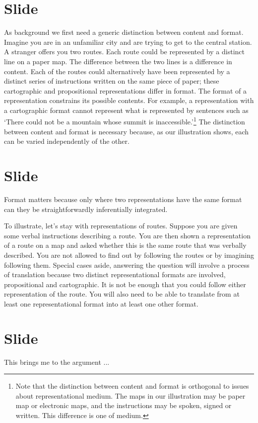 \documentclass[12pt,\papersize]{extarticle}
\begin{document}
\section{Slide}
As background we first need a generic distinction between content and format. Imagine you are in an unfamiliar city and are trying to get to the central station. A stranger offers you two routes. Each route could be represented by a distinct line on a paper map. The difference between the two lines is a difference in content. Each of the routes could alternatively have been represented by a distinct series of instructions written on the same piece of paper; these cartographic and propositional representations differ in format. The format of a representation constrains its possible contents. For example, a representation with a cartographic format cannot represent what is represented by sentences such as `There could not be a mountain whose summit is inaccessible.'\footnote{ Note that the distinction between content and format is orthogonal to issues about representational medium. The maps in our illustration may be paper map or electronic maps, and the instructions may be spoken, signed or written. This difference is one of medium.} The distinction between content and format is necessary because, as our illustration shows, each can be varied independently of the other.



\section{Slide}
Format matters because only where two representations have the same format can they be straightforwardly inferentially integrated.

To illustrate, let’s stay with representations of routes.  
Suppose you are given some verbal instructions describing a route. You are then shown a representation of a route on a map and asked whether this is the same route that was verbally described. You are not allowed to find out by following the routes or by imagining following them. 
Special cases aside, answering the question will involve a process of translation because two distinct representational formats are involved, propositional and cartographic. It is not be enough that you could follow either representation of the route. You will also need to be able to translate from at least one representational format into at least one other format. 



\section{Slide}
This brings me to the argument ...
\end{document}
